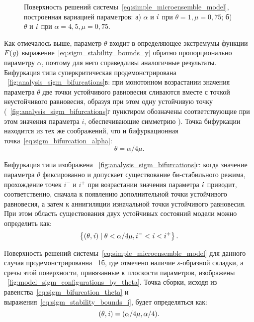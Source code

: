 \begin{figure}[t]
    \caption{Поверхность решений системы~\eqref{eq:simple_microensemble_model}, построенная вариацией параметров: а) $\alpha$ и $\mathit{i}$ при $\theta = 1, \mu = 0,75$; б) $\theta$ и $\mathit{i}$ при $\alpha = 4,5, \mu = 0,75$.}
    \label{fig:analysis_sigm_solution_surface}
\end{figure}

Как отмечалось выше, параметр $\theta$ входит в определяющее экстремумы функции $F(\mathit{y})$ выражение~\eqref{eq:sigm_stability_bounds_y} обратно пропорционально параметру $\alpha$, поэтому для него справедливы аналогичные результаты. Бифуркация типа суперкритическая  продемонстрирована \onfigure~\ref{fig:analysis_sigm_bifurcations}в: при монотонном возрастании значения параметра $\theta$ две точки устойчивого равновесия сливаются вместе с точкой неустойчивого равновесия, образуя при этом одну устойчивую точку (\onfigure~\ref{fig:analysis_sigm_bifurcations}г пунктиром обозначены соответствующие при этом значения параметра $i$, обеспечивающие симметрию ). Точка бифуркации находится из тех же соображений, что и бифуркационная точка~\eqref{eq:sigm_bifurcation_alpha}:
\begin{equation}
    \label{eq:sigm_bifurcation_theta}
    \theta =  \alpha / 4 \mu.
\end{equation}

Бифуркация типа  изображена \onfigure~\ref{fig:analysis_sigm_bifurcations}г: когда значение параметра $\theta$ фиксированно и допускает существование би-стабильного режима, прохождение точек $i^{-}$ и $i^{+}$ при возрастании значения параметра $\mathit{i}$ приводит, соответственно, сначала к появлению дополнительной точки устойчивого равновесия, а затем к аннигиляции изначальной точки устойчивого равновесия. При этом область существования двух устойчивых состояний модели можно определить как: 
\begin{equation}
    \nonumber
    \left\{(\theta, \mathit{i}) \mid \theta < \alpha / 4 \mu, i^{-} < \mathit{i} < i^{+}\right\}.
\end{equation}

Поверхность решений системы~\eqref{eq:simple_microensemble_model} для данного случая продемонстрированна \onfigure~\ref{fig:analysis_sigm_solution_surface}б, где отмечено наличие $s$-образной складки, а срезы этой поверхности, привязанные к плоскости параметров, изображены \onfigure~\ref{fig:model_sigm_configurations_by_theta}. Точка сборки, исходя из равенства~\eqref{eq:sigm_bifurcation_theta} и выражения~\eqref{eq:sigm_stability_bounds_i}, будет определяться как:
\begin{equation}
    \nonumber
    (\theta, \mathit{i}) = (\alpha / 4 \mu, \alpha / 4).
\end{equation}

